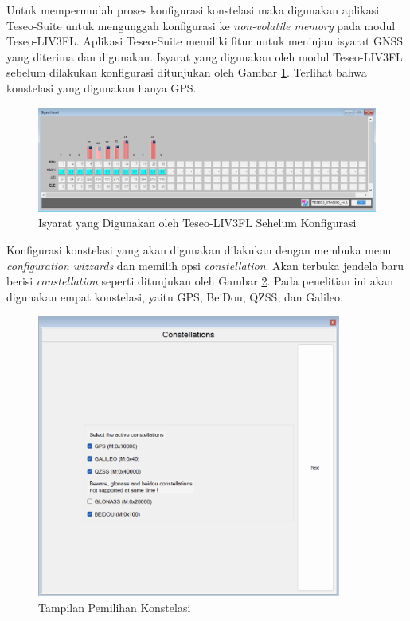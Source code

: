 Untuk mempermudah proses konfigurasi konstelasi maka digunakan aplikasi Teseo-Suite untuk mengunggah konfigurasi ke \textit{non-volatile memory} pada modul Teseo-LIV3FL. Aplikasi Teseo-Suite memiliki fitur untuk meninjau isyarat GNSS yang diterima dan digunakan. Isyarat yang digunakan oleh modul Teseo-LIV3FL sebelum dilakukan konfigurasi ditunjukan oleh Gambar \ref{Fig: sebelum-konfigurasi}. Terlihat bahwa konstelasi yang digunakan hanya GPS.
 
 \begin{figure}[H]
 	\centering
 	\includegraphics[width=14cm]{contents/chapter-3/setting-konstelasi/sebelum-konfigurasi.png}
 	\caption{Isyarat yang Digunakan oleh Teseo-LIV3FL Sehelum Konfigurasi}
 	\label{Fig: sebelum-konfigurasi}
 \end{figure}
 
Konfigurasi konstelasi yang akan digunakan dilakukan dengan membuka menu \textit{configuration wizzards} dan memilih opsi \textit{constellation}. Akan terbuka jendela baru berisi \textit{constellation} seperti ditunjukan oleh Gambar \ref{Fig: pilih-konstelasi}. Pada penelitian ini akan digunakan empat konstelasi, yaitu GPS, BeiDou, QZSS, dan Galileo.

\begin{figure}[H]
	\centering
	\includegraphics[width=10cm]{contents/chapter-3/setting-konstelasi/pilih-konfigurasi.png}
	\caption{Tampilan Pemilihan Konstelasi}
	\label{Fig: pilih-konstelasi}
\end{figure}


